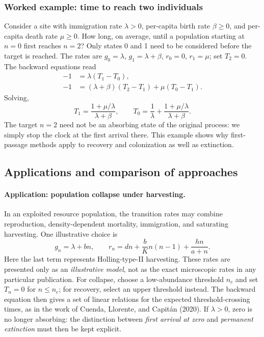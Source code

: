 \subsubsection{Worked example: time to reach two individuals}
Consider a site with immigration rate $\lambda>0$, per-capita birth
rate $\beta\geq0$, and per-capita death rate $\mu\geq0$. How long,
on average, until a population starting at $n=0$ first reaches $n=2$?
Only states 0 and 1 need to be considered before the target is reached.
The rates are $g_0=\lambda$, $g_1=\lambda+\beta$,
$r_0=0$, $r_1=\mu$; set $T_2=0$. The backward equations read
\begin{align}
 -1&=\lambda(T_1-T_0),\label{eq:ext-two-zero}\\
 -1&=(\lambda+\beta)(T_2-T_1)+\mu(T_0-T_1).
 \label{eq:ext-two-one}
\end{align}
Solving,
\begin{equation}
 \boxed{T_1=\frac{1+\mu/\lambda}{\lambda+\beta},\qquad
 T_0=\frac{1}{\lambda}+\frac{1+\mu/\lambda}{\lambda+\beta}.}
 \label{eq:ext-two-solution}
\end{equation}
The target $n=2$ need not be an absorbing state of the original process:
we simply stop the clock at the first arrival there. This example
shows why first-passage methods apply to recovery and colonization as
well as extinction.

\subsection{Applications and comparison of approaches}
\label{subsec:ext-applications}

\paragraph{Application: population collapse under harvesting.}
In an exploited resource population, the transition rates may combine
reproduction, density-dependent mortality, immigration, and saturating
harvesting. One illustrative choice is
\begin{equation}
 g_n=\lambda+bn,\qquad
 r_n=dn+\frac{b}{K}n(n-1)+\frac{hn}{a+n}.
 \label{eq:ext-harvest-example}
\end{equation}
Here the last term represents Holling-type-II harvesting. These rates
are presented only as an \emph{illustrative model}, not as the exact
microscopic rates in any particular publication. For collapse, choose a
low-abundance threshold $n_c$ and set $T_n=0$ for $n\leq n_c$; for
recovery, select an upper threshold instead. The backward equation
then gives a set of linear relations for the expected threshold-crossing
times, as in the work of Cuenda, Llorente, and Capit\'an (2020).
If $\lambda>0$, zero is no longer absorbing: the distinction between
\emph{first arrival at zero} and \emph{permanent extinction} must then
be kept explicit.

